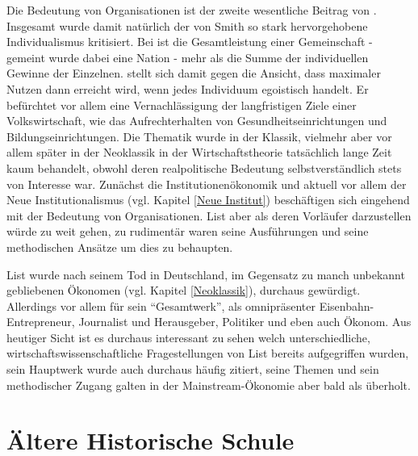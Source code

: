 Die Bedeutung von Organisationen ist der zweite wesentliche Beitrag von \textcite{List1841}. Insgesamt wurde damit natürlich der von Smith so stark hervorgehobene Individualismus kritisiert. Bei \textcite{List1841} ist die Gesamtleistung einer Gemeinschaft - gemeint wurde dabei eine Nation - mehr als die Summe der individuellen Gewinne der Einzelnen.  \textcite{List1841} stellt sich damit gegen die Ansicht, dass maximaler Nutzen dann erreicht wird, wenn jedes Individuum egoistisch handelt. Er befürchtet vor allem eine Vernachlässigung der langfristigen Ziele einer Volkswirtschaft, wie das Aufrechterhalten von Gesundheitseinrichtungen und Bildungseinrichtungen. Die Thematik wurde in der Klassik, vielmehr aber vor allem später in der Neoklassik in der Wirtschaftstheorie tatsächlich lange Zeit kaum behandelt, obwohl deren realpolitische Bedeutung selbstverständlich stets von Interesse war. Zunächst die Institutionenökonomik und aktuell vor allem der Neue Institutionalismus (vgl. Kapitel \ref{Neue Institut}) beschäftigen sich eingehend mit der Bedeutung von Organisationen. List aber als deren Vorläufer darzustellen würde zu weit gehen, zu rudimentär waren seine Ausführungen und seine methodischen Ansätze um dies zu behaupten.

List wurde nach seinem Tod in Deutschland, im Gegensatz zu manch unbekannt gebliebenen Ökonomen (vgl. Kapitel \ref{Neoklassik}), durchaus gewürdigt. Allerdings vor allem für sein "`Gesamtwerk"', als omnipräsenter Eisenbahn-Entrepreneur, Journalist und Herausgeber, Politiker und eben auch Ökonom. Aus heutiger Sicht ist es durchaus interessant zu sehen welch unterschiedliche, wirtschaftswissenschaftliche Fragestellungen von List bereits aufgegriffen wurden, sein Hauptwerk \textcite{List1841} wurde auch durchaus häufig zitiert, seine Themen und sein methodischer Zugang galten in der Mainstream-Ökonomie aber bald als überholt.

\section{Ältere Historische Schule}
\label{Hist_Schulen}

